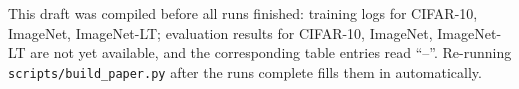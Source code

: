\begin{tcolorbox}[colback=yellow!8!white,colframe=yellow!55!black,boxrule=0.4pt,left=4pt,right=4pt,top=3pt,bottom=3pt]
\footnotesize This draft was compiled before all runs finished: training logs for CIFAR-10, ImageNet, ImageNet-LT; evaluation results for CIFAR-10, ImageNet, ImageNet-LT are not yet available, and the corresponding table entries read ``--''. Re-running \texttt{scripts/build\_paper.py} after the runs complete fills them in automatically.
\end{tcolorbox}
